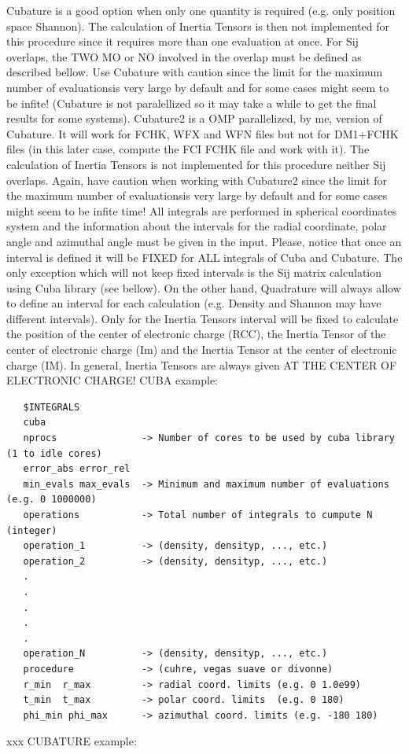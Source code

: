 \documentclass[10pt,a4paper]{article}
\begin{document}
Cubature is a good option when only one quantity is required (e.g. only position space Shannon). The calculation of Inertia Tensors is then not implemented for this procedure since it requires more than one evaluation at once. For Sij overlaps, the TWO MO or NO involved in the overlap must be defined as described bellow. Use Cubature with caution since the limit for the maximum number of evaluationsis very large by default and for some cases might seem to be infite! (Cubature is not paralellized so it may take a while to get the final results for some systems). \newline
Cubature2 is a OMP parallelized, by me, version of Cubature. It will work for FCHK, WFX and WFN files but not for DM1$+$FCHK files (in this later case, compute the FCI FCHK file and work with it). The calculation of Inertia Tensors is not implemented for this procedure neither Sij overlaps. Again, have caution when working with Cubature2 since the limit for the maximum number of evaluationsis very large by default and for some cases might seem to be infite time!\newline
All integrals are performed in spherical coordinates system and the information about the intervals for the radial coordinate, polar angle and azimuthal angle must be given in the input. Please, notice that once an interval is defined it will be FIXED for ALL integrals of Cuba and Cubature. The only exception which will not keep fixed intervals is the Sij matrix calculation using Cuba library (see bellow). On the other hand, Quadrature will always allow to define an interval for each calculation (e.g. Density and Shannon may have different intervals). Only for the Inertia Tensors interval will be fixed to calculate the position of the center of electronic charge (RCC), the Inertia Tensor of the center of electronic charge (Im) and the Inertia Tensor at the center of electronic charge (IM). In general, Inertia Tensors are always given AT THE CENTER OF ELECTRONIC CHARGE!\newline  
\newline
\noindent CUBA example:\newline
\begin{verbatim}
   $INTEGRALS
   cuba
   nprocs               -> Number of cores to be used by cuba library (1 to idle cores) 
   error_abs error_rel    
   min_evals max_evals  -> Minimum and maximum number of evaluations (e.g. 0 1000000)
   operations           -> Total number of integrals to cumpute N (integer)
   operation_1          -> (density, densityp, ..., etc.) 
   operation_2          -> (density, densityp, ..., etc.) 
   .
   .
   .
   .
   .
   operation_N          -> (density, densityp, ..., etc.) 
   procedure            -> (cuhre, vegas suave or divonne)
   r_min  r_max         -> radial coord. limits (e.g. 0 1.0e99)
   t_min  t_max         -> polar coord. limits  (e.g. 0 180)
   phi_min phi_max      -> azimuthal coord. limits (e.g. -180 180)
\end{verbatim}
{\color{white} xxx \newline}
\noindent CUBATURE example:\newline
\end{document}
